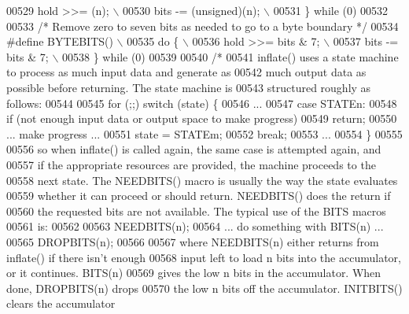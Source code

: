 \begin{DoxyCode}
{{{{00529 \textcolor{preprocessor}{        hold >>= (n); \(\backslash\)}
00530 \textcolor{preprocessor}{        bits -= (unsigned)(n); \(\backslash\)}
00531 \textcolor{preprocessor}{    \} while (0)}
00532 
00533 \textcolor{comment}{/* Remove zero to seven bits as needed to go to a byte boundary */}
00534 \textcolor{preprocessor}{#define BYTEBITS() \(\backslash\)}
00535 \textcolor{preprocessor}{    do \{ \(\backslash\)}
00536 \textcolor{preprocessor}{        hold >>= bits & 7; \(\backslash\)}
00537 \textcolor{preprocessor}{        bits -= bits & 7; \(\backslash\)}
00538 \textcolor{preprocessor}{    \} while (0)}
00539 
00540 \textcolor{comment}{/*}
00541 \textcolor{comment}{   inflate() uses a state machine to process as much input data and generate as}
00542 \textcolor{comment}{   much output data as possible before returning.  The state machine is}
00543 \textcolor{comment}{   structured roughly as follows:}
00544 \textcolor{comment}{}
00545 \textcolor{comment}{    for (;;) switch (state) \{}
00546 \textcolor{comment}{    ...}
00547 \textcolor{comment}{    case STATEn:}
00548 \textcolor{comment}{        if (not enough input data or output space to make progress)}
00549 \textcolor{comment}{            return;}
00550 \textcolor{comment}{        ... make progress ...}
00551 \textcolor{comment}{        state = STATEm;}
00552 \textcolor{comment}{        break;}
00553 \textcolor{comment}{    ...}
00554 \textcolor{comment}{    \}}
00555 \textcolor{comment}{}
00556 \textcolor{comment}{   so when inflate() is called again, the same case is attempted again, and}
00557 \textcolor{comment}{   if the appropriate resources are provided, the machine proceeds to the}
00558 \textcolor{comment}{   next state.  The NEEDBITS() macro is usually the way the state evaluates}
00559 \textcolor{comment}{   whether it can proceed or should return.  NEEDBITS() does the return if}
00560 \textcolor{comment}{   the requested bits are not available.  The typical use of the BITS macros}
00561 \textcolor{comment}{   is:}
00562 \textcolor{comment}{}
00563 \textcolor{comment}{        NEEDBITS(n);}
00564 \textcolor{comment}{        ... do something with BITS(n) ...}
00565 \textcolor{comment}{        DROPBITS(n);}
00566 \textcolor{comment}{}
00567 \textcolor{comment}{   where NEEDBITS(n) either returns from inflate() if there isn't enough}
00568 \textcolor{comment}{   input left to load n bits into the accumulator, or it continues.  BITS(n)}
00569 \textcolor{comment}{   gives the low n bits in the accumulator.  When done, DROPBITS(n) drops}
00570 \textcolor{comment}{   the low n bits off the accumulator.  INITBITS() clears the accumulator}
}}}}
\end{DoxyCode}
